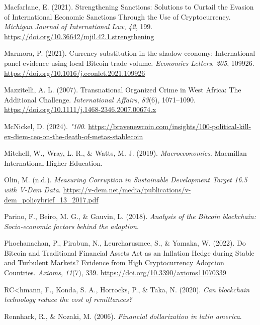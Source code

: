 \documentclass[
]{article}
\newlength{\cslhangindent}
\newenvironment{CSLReferences}[2] %
 {\begin{list}{}{%
  \setlength{\itemindent}{0pt}
  \setlength{\leftmargin}{0pt}
  \setlength{\parsep}{0pt}
  \ifodd #1
   \setlength{\leftmargin}{\cslhangindent}
   \setlength{\itemindent}{-1\cslhangindent}
  \fi
  \setlength{\itemsep}{#2\baselineskip}}}
 {\end{list}}
\begin{document}
\begin{CSLReferences}{1}{0}
Macfarlane, E. (2021). Strengthening Sanctions: Solutions to Curtail the Evasion of International Economic Sanctions Through the Use of Cryptocurrency. \emph{Michigan Journal of International Law}, \emph{42}, 199. \url{https://doi.org/10.36642/mjil.42.1.strengthening}

Marmora, P. (2021). Currency substitution in the shadow economy: International panel evidence using local Bitcoin trade volume. \emph{Economics Letters}, \emph{205}, 109926. \url{https://doi.org/10.1016/j.econlet.2021.109926}

Mazzitelli, A. L. (2007). Transnational Organized Crime in West Africa: The Additional Challenge. \emph{International Affairs}, \emph{83}(6), 1071--1090. \url{https://doi.org/10.1111/j.1468-2346.2007.00674.x}

McNickel, D. (2024). \emph{{"}100}. \url{https://bravenewcoin.com/insights/100-political-kill-ex-diem-ceo-on-the-death-of-metas-stablecoin}

Mitchell, W., Wray, L. R., \& Watts, M. J. (2019). \emph{Macroeconomics}. Macmillan International Higher Education.

Olin, M. (n.d.). \emph{Measuring Corruption in Sustainable Development Target 16.5 with V-Dem Data}. \url{https://v-dem.net/media/publications/v-dem_policybrief_13_2017.pdf}

Parino, F., Beiro, M. G., \& Gauvin, L. (2018). \emph{Analysis of the Bitcoin blockchain: Socio-economic factors behind the adoption}.

Phochanachan, P., Pirabun, N., Leurcharusmee, S., \& Yamaka, W. (2022). Do Bitcoin and Traditional Financial Assets Act as an Inflation Hedge during Stable and Turbulent Markets? Evidence from High Cryptocurrency Adoption Countries. \emph{Axioms}, \emph{11}(7), 339. \url{https://doi.org/10.3390/axioms11070339}

RC\textless hmann, F., Konda, S. A., Horrocks, P., \& Taka, N. (2020). \emph{Can blockchain technology reduce the cost of remittances?}

Rennhack, R., \& Nozaki, M. (2006). \emph{Financial dollarization in latin america}.


\end{CSLReferences}
\end{document}
